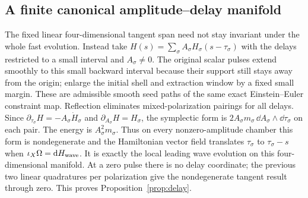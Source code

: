 \subsection{A finite canonical amplitude--delay manifold}

The fixed linear four-dimensional tangent span need not stay invariant under the whole fast evolution. Instead take \(H(s)=\sum_{\sigma}A_\sigma H_\sigma(s-\tau_\sigma)\) with the delays restricted to a small interval and \(A_\sigma\ne0\). The original scalar pulses extend smoothly to this small backward interval because their support still stays away from the origin; enlarge the initial shell and extraction window by a fixed small margin. These are admissible smooth seed paths of the same exact Einstein--Euler constraint map. Reflection eliminates mixed-polarization pairings for all delays. Since \(\partial_{\tau_\sigma}H=-A_\sigma\dot H_\sigma\) and \(\partial_{A_\sigma}H=H_\sigma\), the symplectic form is \(2A_\sigma m_\sigma\,\dd A_\sigma\wedge\dd\tau_\sigma\) on each pair. The energy is \(A_\sigma^2m_\sigma\). Thus on every nonzero-amplitude chamber this form is nondegenerate and the Hamiltonian vector field translates \(\tau_\sigma\) to \(\tau_\sigma-s\) when \(\iota_X\Omega=\mathrm d H_{\rm wave}\). It is exactly the local leading wave evolution on this four-dimensional manifold. At a zero pulse there is no delay coordinate; the previous two linear quadratures per polarization give the nondegenerate tangent result through zero. This proves Proposition~\ref{prop:delay}.

